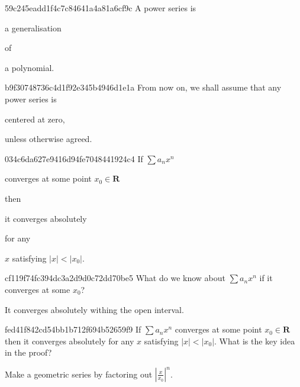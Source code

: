 \begin{note}{59c245eadd1f4c7c84641a4a81a6cf9c}
    A power series is \begin{icloze}{2}a generalisation\end{icloze} of \begin{icloze}{1}a polynomial.\end{icloze}
\end{note}

\begin{note}{b9f30748736c4d1f92e345b4946d1e1a}
    From now on, we shall assume that any power series is \begin{icloze}{1}centered at zero,\end{icloze} unless otherwise agreed.
\end{note}

\begin{note}{034c6da627e9416d94fe7048441924c4}
    If \({ \sum a_n x^{n} }\) \begin{icloze}{2}converges at some point \({ x_0 \in \mathbf{R} }\)\end{icloze} then \begin{icloze}{1}it converges absolutely\end{icloze} for any \begin{icloze}{3}\({ x }\) satisfying \({ \left\lvert x \right\rvert < \left\lvert x_0 \right\rvert }\).\end{icloze}
\end{note}

\begin{note}{cf119f74fc394dc3a2d9d0c72dd70be5}
    What do we know about \({ \sum a_n x^{n} }\) if it converges at some \({ x_0 }\)?

    \begin{cloze}{1}
        It converges absolutely withing the open interval.
    \end{cloze}
\end{note}

\begin{note}{fed41f842cd54bb1b712f694b52659f9}
    If \({ \sum a_n x^{n} }\) converges at some point \({ x_0 \in \mathbf{R} }\) then it converges absolutely for any \({ x }\) satisfying \({ \left\lvert x \right\rvert < \left\lvert x_0 \right\rvert }\).
    What is the key idea in the proof?

    \begin{cloze}{1}
        Make a geometric series by factoring out \({ \left\lvert \frac{x}{x_0} \right\rvert^{n} }\).
    \end{cloze}
\end{note}

